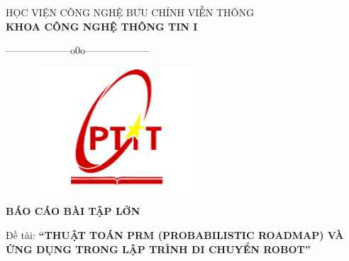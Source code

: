 \documentclass[12pt,a4paper,openany,oneside]{report}
\renewcommand{\headrulewidth}{0pt}
\begin{document}
	
	\pagestyle{fancy}
	\fancyhf{}
	\renewcommand{\headrulewidth}{0.4pt} %
	\renewcommand{\footrulewidth}{0.4pt} %
	
	

\setlength{\fboxrule}{1.5pt}
\thisfancypage{\setlength{\fboxsep}{10pt}\setlength{\shadowsize}{0pt}\doublebox}{}

\begin{titlepage}
\fontsize{14pt}{14pt}\selectfont \baselineskip 0.65cm
\thispagestyle{empty}
\begin{center}
{HỌC VIỆN CÔNG NGHỆ BƯU CHÍNH VIỄN THÔNG}\\
\textbf{\MakeUppercase{KHOA CÔNG NGHỆ THÔNG TIN I}}\\
\centerline{--------------------o0o--------------------}  
\end{center}
 

\begin{figure}[H]
	\begin{center}
		\includegraphics[width=6cm]{./logo}
	\end{center}
\end{figure} 
 
 
\vspace{0.5cm}
\begin{center}
\textbf{\MakeUppercase{\LARGE \bf BÁO CÁO BÀI TẬP LỚN}}\\ 
\end{center} 

\vspace{1cm}
\begin{center}
	Đề tài: 
	\textbf{\MakeUppercase{ \bf ``THUẬT TOÁN PRM (PROBABILISTIC ROADMAP) VÀ ỨNG DỤNG TRONG LẬP TRÌNH DI CHUYỂN ROBOT''}}\\ 
\end{center} 
\vspace{2cm}



\end{titlepage}
\end{document}

